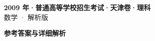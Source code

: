 \documentclass[zihao=-4, a4paper]{ctexart}
\begin{document}
\begin{center}
  {\Large\bfseries 2009 年·普通高等学校招生考试·天津卷·理科}\\[4pt]
  {\large 数学 · 解析版}
\end{center}
\medskip
{}

\clearpage
{}
\begin{center}{\Large\bfseries 参考答案与详细解析}\end{center}
\medskip

\end{document}
